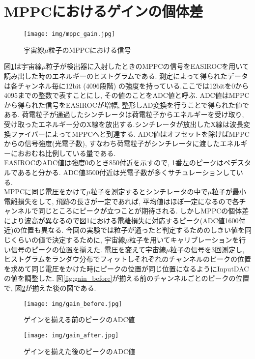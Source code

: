 \section{MPPCにおけるゲインの個体差}\label{sec:mppc_gain_diff}
\begin{figure}[H]
    \centering
    \texttt{[image: img/mppc\_gain.jpg]}
    \caption{宇宙線$\mu$粒子のMPPCにおける信号}
    \label{fig:mu_mppc}
\end{figure}

図\ref{fig:mu_mppc}は宇宙線$\mu$粒子が検出器に入射したときのMPPCの信号をEASIROCを用いて読み出した時のエネルギーのヒストグラムである.
測定によって得られたデータは各チャンネル毎に12bit (4096段階) の強度を持っている.ここでは12bitを0から4095までの整数で表すことにし, その値のことをADC値と呼ぶ.
ADC値はMPPCから得られた信号をEASIROCが増幅, 整形しAD変換を行うことで得られた値である.
荷電粒子が通過したシンチレータは荷電粒子からエネルギーを受け取り, 受け取ったエネルギー分のX線を放出する.シンチレータが放出したX線は波長変換ファイバーによってMPPCへと到達する.
ADC値はオフセットを除けばMPPCからの信号強度(光電子数), すなわち荷電粒子がシンチレータに渡したエネルギーにおおむね比例している量である.
\\
EASIROCのADC値は強度0のとき850付近を示すので, 1番左のピークはペデスタルであると分かる.
ADC値3500付近は光電子数が多くサチュレーションしている.\\
MPPCに同じ電圧をかけて$\mu$粒子を測定するとシンチレータの中で$\mu$粒子が最小電離損失をして, 飛跡の長さが一定であれば, 平均値はほぼ一定になるので各チャンネルで同じところにピークが立つことが期待される.
しかしMPPCの個体差により波高が異なるので図\ref{fig:mu_mppc}における電離損失に対応するピーク(ADC値1600付近)の位置も異なる.
今回の実験では粒子が通ったと判定するためのしきい値を同じくらいの値で決定するために, 宇宙線$\mu$粒子を用いてキャリブレーションを行い信号のピークの位置を揃えた.
電圧を変えて宇宙線$\mu$粒子の信号を3回測定し, ヒストグラムをランダウ分布でフィットしそれぞれのチャンネルのピークの位置を求めて同じ電圧をかけた時にピークの位置が同じ位置になるようにInputDACの値を調整した.
図\ref{fig:gain_before}が揃える前のチャンネルごとのピークの位置で, 図\ref{fig:gain_after}が揃えた後の図である.
\begin{figure}[H]
    \begin{minipage}[b]{0.47\linewidth}
        \centering
        \texttt{[image: img/gain\_before.jpg]}
        \caption{ゲインを揃える前のピークのADC値}
        \label{fig:gain_before}
    \end{minipage}
    \begin{minipage}[b]{0.47\linewidth}
        \centering
        \texttt{[image: img/gain\_after.jpg]}
        \caption{ゲインを揃えた後のピークのADC値}
        \label{fig:gain_after}
    \end{minipage}
\end{figure}